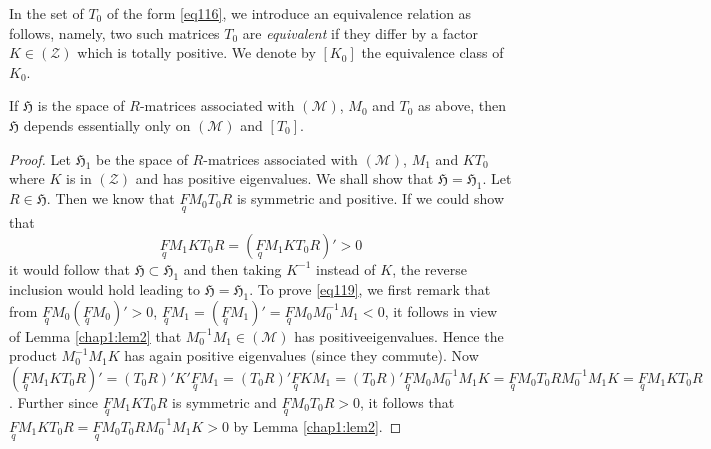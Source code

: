 In the set of $T_{0}$ of the form \eqref{eq116}, we introduce an
equivalence relation as follows, namely, two such matrices $T_{0}$ are
{\em equivalent} if they differ by a factor $K\in(\mathscr{Z})$ which
is totally positive. We denote by $[K_{0}]$ the equivalence class of
$K_{0}$. 

\begin{proposition}\label{prop16}
If $\mathfrak{H}$ is the space of $R$-matrices associated with
$(\mathscr{M})$, $M_{0}$ and $T_{0}$ as above, then $\mathfrak{H}$
depends essentially only on $(\mathscr{M})$ and $[T_{0}]$.
\end{proposition}

\begin{proof}
Let $\mathfrak{H}_{1}$ be the space of $R$-matrices associated with
$(\mathscr{M})$, $M_{1}$ and $KT_{0}$ where $K$ is in $(\mathscr{Z})$
and has positive eigenvalues. We shall show that
$\mathfrak{H}=\mathfrak{H}_{1}$. Let $R\in\mathfrak{H}$. Then we know
that $\underset{q}{F}M_{0}T_{0}R$ is symmetric and positive. If we
could show that
\begin{equation*}
\underset{q}{F}M_{1}KT_{0}R=(\underset{q}{F}
M_{1}KT_{0}R)'>0\tag{119}\label{eq119} 
\end{equation*}
it would follow that $\mathfrak{H}\subset \mathfrak{H}_{1}$ and then
taking $K^{-1}$ instead of $K$, the reverse inclusion would hold
leading to $\mathfrak{H}=\mathfrak{H}_{1}$. To prove \eqref{eq119}, we
first remark that from
$\underset{q}{F}M_{0}(\underset{q}{F}M_{0})'>0$,
$\underset{q}{F}M_{1}=(\underset{q}{F}M_{1})'=\underset{q}{F}M_{0}M^{-1}_{0}M_{1}<0$,
it follows in view of Lemma \ref{chap1:lem2} that $M^{-1}_{0}M_{1}\in
(\mathscr{M})$ has positive\pageoriginale eigenvalues. Hence the
product $M^{-1}_{0}M_{1}K$ has again positive eigenvalues (since they
commute). Now
$(\underset{q}{F}M_{1}KT_{0}R)'=(T_{0}R)'K'\underset{q}{F}M_{1}=
(T_{0}R)'\underset{q}{F}KM_{1}=(T_{0}R)'\underset{q}{F}M_{0}M^{-1}_{0}
M_{1}K=\underset{q}{F}M_{0}T_{0}RM^{-1}_{0}M_{1}K=\underset{q}{F}M_{1}KT_{0}R$. Further 
since $\underset{q}{F}M_{1}KT_{0}R$ is symmetric and
$\underset{q}{F}M_{0}T_{0}R>0$, it follows that
$\underset{q}{F}M_{1}KT_{0}R=\underset{q}{F}M_{0}T_{0}RM^{-1}_{0}M_{1}K>0$
by Lemma \ref{chap1:lem2}.
\end{proof}

